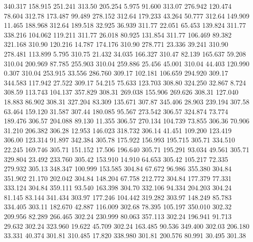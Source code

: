  340.317  158.915  251.241       313.50
 205.254    5.975   91.600       313.07
 276.942  120.474   78.604       312.78
 173.487   99.489  278.152       312.64
 179.233   43.264   50.777       312.64
 149.909   11.465  188.968       312.64
 189.518   32.925   36.939       311.77
  22.051   65.453  139.824       311.77
 338.216  104.062  119.211       311.77
  26.018   80.925  131.854       311.77
 106.469   89.382  321.168       310.90
 120.216   14.787  174.176       310.90
 278.771   23.336   39.241       310.90
 278.481  113.899    5.795       310.75
  21.432   34.035  166.327       310.47
  82.139  165.637   59.208       310.04
 200.969   87.785  255.903       310.04
 259.886   25.456   45.001       310.04
  44.403  120.990    0.307       310.04
 253.915   33.556  286.760       309.17
 102.181  106.659  294.920       309.17
 344.583  117.942   27.522       309.17
  54.215   75.633  123.703       308.80
 324.250   32.867    8.724       308.59
 113.743  104.137  357.829       308.31
 269.038  155.906  269.626       308.31
 127.040   18.883   86.902       308.31
 327.204   83.309  135.671       307.87
 345.406   28.903  239.194       307.58
  63.464  159.120   31.587       307.44
 180.085   95.567  273.542       306.57
 324.874   73.774  189.476       306.57
 204.088   89.130   11.355       306.57
 270.134  104.739   73.855       306.36
  70.906   31.210  206.382       306.28
  12.953  146.023  318.732       306.14
  41.451  109.200  123.419       306.00
 123.314   91.897  342.384       305.78
 175.922  156.993  195.715       305.71
 334.510   22.245  169.746       305.71
 151.152   17.506  196.640       305.71
 195.291   93.034   49.561       305.71
 329.804   23.492  233.760       305.42
 153.910   14.910   64.653       305.42
 105.217   72.335  279.932       305.13
 348.347  100.999  153.585       304.84
  67.672   96.986  355.380       304.84
 351.902   21.170  202.042       304.84
 148.204   67.758  212.772       304.84
 177.379   77.331  333.124       304.84
 359.111   93.540  163.398       304.70
 332.106   94.334  204.203       304.24
  81.145   83.144  341.434       303.97
 177.246  104.442  319.282       303.97
 148.249   85.783  334.405       303.11
 182.670   42.887  116.009       302.68
  78.395  105.197  350.010       302.32
 209.956   82.289  266.465       302.24
 230.999   80.063  357.113       302.24
 196.941   91.713   29.632       302.24
 323.960   19.622   45.709       302.24
 163.485   90.536  349.400       302.03
 206.180   33.331   40.374       301.81
 310.485   17.820  338.980       301.81
 200.576   80.991   30.495       301.38
